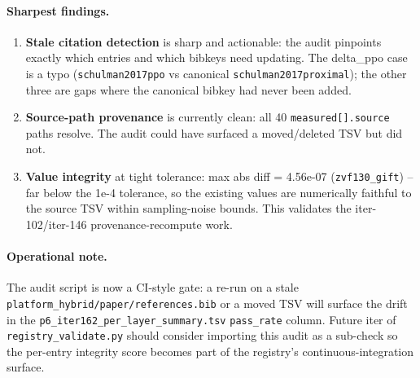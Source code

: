 \paragraph{Sharpest findings.}
\begin{enumerate}
\item \textbf{Stale citation detection} is sharp and actionable: the audit
pinpoints exactly which entries and which bibkeys need updating. The
delta\_ppo case is a typo (\texttt{schulman2017ppo} vs canonical
\texttt{schulman2017proximal}); the other three are gaps where the
canonical bibkey had never been added.
\item \textbf{Source-path provenance} is currently clean: all 40
\texttt{measured[].source} paths resolve. The audit could have surfaced
a moved/deleted TSV but did not.
\item \textbf{Value integrity} at tight tolerance: max abs diff = 4.56e-07
(\texttt{zvf130\_gift}) -- far below the 1e-4 tolerance, so the existing
values are numerically faithful to the source TSV within sampling-noise
bounds. This validates the iter-102/iter-146 provenance-recompute work.
\end{enumerate}

\paragraph{Operational note.}
The audit script is now a CI-style gate: a re-run on a stale
\texttt{platform_hybrid/paper/references.bib} or a moved TSV will surface the drift in
the \texttt{p6\_iter162\_per\_layer\_summary.tsv} \texttt{pass\_rate}
column. Future iter of \texttt{registry\_validate.py} should consider
importing this audit as a sub-check so the per-entry integrity score
becomes part of the registry's continuous-integration surface.